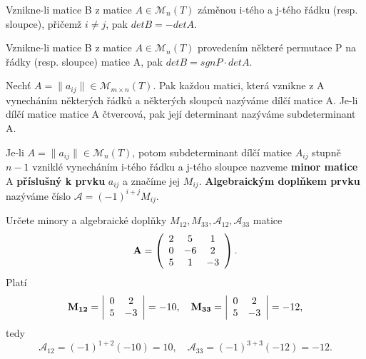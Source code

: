\begin{sentence}
	Vznikne-li matice B z matice $A \in \mathscr{M}_n(T)$ záměnou i-tého a j-tého řádku (resp. sloupce), přičemž $i \not= j$, pak $detB = - detA$.
\end{sentence}

\begin{sentence}
	Vznikne-li matice B z matice $A \in \mathscr{M}_n(T)$ provedením některé permutace P na řádky (resp. sloupce) matice A, pak $detB = sgnP \cdot detA$.
\end{sentence}

\begin{definition}
	Nechť $A = \| a_{ij} \| \in \mathscr{M}_{m \times n}(T)$. Pak každou matici, která vznikne z A vynecháním některých řádků a některých sloupců nazýváme dílčí matice A. Je-li dílčí matice matice A čtvercová, pak její determinant nazýváme subdeterminant A.
\end{definition}

\begin{definition}
	Je-li  $A = \| a_{ij} \| \in \mathscr{M}_{n}(T)$, potom subdeterminant dílčí matice $A_{ij}$ stupně $n - 1$ vzniklé vynecháním i-tého řádku a j-tého sloupce nazveme \textbf{minor matice} A \textbf{příslušný k prvku} $a_{ij}$ a značíme jej $M_{ij}$. \textbf{Algebraickým doplňkem prvku} nazýváme číslo $\mathscr{A} = (-1)^{i+j} M_{ij}$.
\end{definition}

\begin{example}
	Určete minory a algebraické doplňky $M_{12}, M_{33}, \mathscr{A}_{12}, \mathscr{A}_{33}$ matice
	\begin{displaymath}
		{\bf A} =
		\left( \begin{array}{ccc}
			2 & 5 & 1  \\
			0 & -6 & 2  \\
			5 & 1 & -3  \\
		\end{array} \right).
	\end{displaymath}
Platí
	\begin{displaymath}
		{\bf M_{12}} =
		\left| \begin{array}{cc}
			0 & 2   \\
			5 & -3  \\
		\end{array} \right| = -10, \quad
		{\bf M_{33}} =
		\left| \begin{array}{cc}
			0 & 2   \\
			5 & -3  \\
		\end{array} \right| = -12, 
	\end{displaymath}
	tedy $$ \mathscr{A}_{12} = (-1)^{1+2}(-10) = 10,\quad \mathscr{A}_{33} = (-1)^{3+3}(-12) = -12.$$
\end{example}

